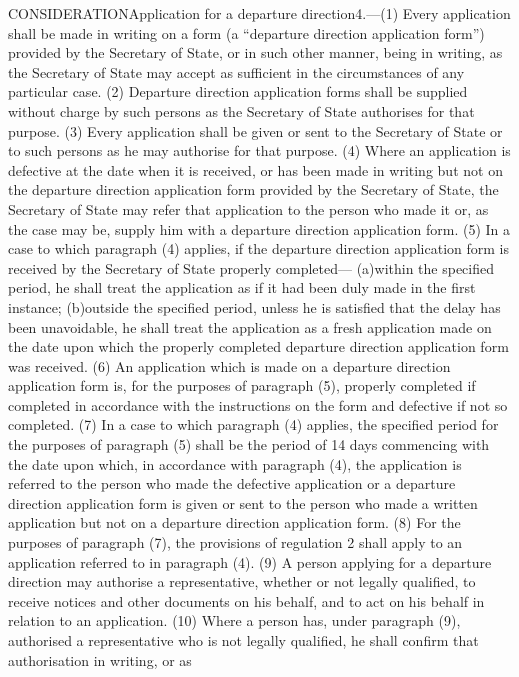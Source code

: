 \documentclass[a4paper]{article}
\begin{document}
CONSIDERATIONApplication for a departure direction4.—(1) Every application shall
be made in writing on a form (a “departure direction application form”) provided
by the Secretary of State, or in such other manner, being in writing, as the
Secretary of State may accept as sufficient in the circumstances of any
particular case.
(2) Departure direction application forms shall be supplied without charge by
such persons as the Secretary of State authorises for that purpose.
(3) Every application shall be given or sent to the Secretary of State or to
such persons as he may authorise for that purpose.
(4) Where an application is defective at the date when it is received, or has
been made in writing but not on the departure direction application form
provided by the Secretary of State, the Secretary of State may refer that
application to the person who made it or, as the case may be, supply him with a
departure direction application form.
(5) In a case to which paragraph (4) applies, if the departure direction
application form is received by the Secretary of State properly completed—
(a)within the specified period, he shall treat the application as if it had been
duly made in the first instance;
(b)outside the specified period, unless he is satisfied that the delay has been
unavoidable, he shall treat the application as a fresh application made on the
date upon which the properly completed departure direction application form was
received.
(6) An application which is made on a departure direction application form is,
for the purposes of paragraph (5), properly completed if completed in accordance
with the instructions on the form and defective if not so completed.
(7) In a case to which paragraph (4) applies, the specified period for the
purposes of paragraph (5) shall be the period of 14 days commencing with the
date upon which, in accordance with paragraph (4), the application is referred
to the person who made the defective application or a departure direction
application form is given or sent to the person who made a written application
but not on a departure direction application form.
(8) For the purposes of paragraph (7), the provisions of regulation 2 shall
apply to an application referred to in paragraph (4).
(9) A person applying for a departure direction may authorise a representative,
whether or not legally qualified, to receive notices and other documents on his
behalf, and to act on his behalf in relation to an application.
(10) Where a person has, under paragraph (9), authorised a representative who is
not legally qualified, he shall confirm that authorisation in writing, or as
\end{document}
